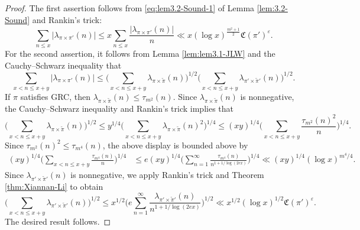 \documentclass[12pt,reqno]{amsart}
\theoremstyle{remark}
\numberwithin{equation}{section}
\begin{document}
    \begin{proof}
        The first assertion follows from \eqref{eq:lem3.2-Sound-1} of Lemma \ref{lem:3.2-Sound} and Rankin's trick:
	\[
            \sum_{n\le x} |\lambda_{\pi\times\pi'}(n)| \leq x\sum_{n\le x} \frac{|\lambda_{\pi\times\pi'}(n)|}{n} \ll x(\log x)^{\frac{m^2+1}{2}}\mathfrak{C}(\pi')^{\varepsilon}.
	\]
        For the second assertion, it follows from Lemma \ref{lem:lem3.1-JLW} and the Cauchy--Schwarz inequality that 
	\begin{equation*}
            \sum_{x < n \le x+y} |\lambda_{\pi \times \pi'}(n)| \le \Big(\sum_{x < n \le x+y} \lambda_{\pi \times \widetilde{\pi}}(n) \Big)^{1/2}\Big(\sum_{x < n \le x+y}\lambda_{\pi' \times \widetilde{\pi}'}(n)\Big)^{1/2}. 
        \end{equation*}
        If $\pi$ satisfies GRC, then $\lambda_{\pi \times \widetilde{\pi}}(n) \le \tau_{m^2}(n)$. Since $\lambda_{\pi \times \widetilde{\pi}}(n)$ is nonnegative, the Cauchy--Schwarz inequality and Rankin's trick implies that
	\begin{equation*}
            \Big(\sum_{x < n \le x+y} \lambda_{\pi \times \widetilde{\pi}}(n) \Big)^{1/2} \le y^{1/4}\Big(\sum_{x < n \le x+y} \lambda_{\pi \times \widetilde{\pi}}(n)^2 \Big)^{1/4} \le (xy)^{1/4}\Big(\sum_{x < n \le x+y} \frac{\tau_{m^2}(n)^2}{n} \Big)^{1/4}.
	\end{equation*}
        Since $\tau_{m^2}(n)^2 \le \tau_{m^4}(n)$, the above display is bounded above by
        \begin{equation*}
		\begin{aligned}
     (xy)^{1/4}\Big(\sum_{x < n \le x+y} \frac{\tau_{m^4}(n)}{n} \Big)^{1/4} & \leq e (xy)^{1/4}\Big(\sum_{n=1}^{\infty} \frac{\tau_{m^4}(n)}{n^{1+1/\log(2ex)}} \Big)^{1/4} \ll (xy)^{1/4}(\log x)^{{m^4}/{4}}.
		\end{aligned}
	\end{equation*}	
        Since $\lambda_{\pi' \times \widetilde{\pi}'}(n)$ is nonnegative, we apply Rankin's trick  and Theorem \ref{thm:Xiannan-Li} to obtain
	\begin{equation*}
            \Big(\sum_{x < n \le x+y} \lambda_{\pi' \times \widetilde{\pi}'}(n)\Big)^{1/2}
            \leq x^{1/2} \Big(e\sum_{ n =1}^{\infty} \frac{\lambda_{\pi' \times \widetilde{\pi}'}(n)}{n^{1+1/\log(2ex)}}\Big)^{1/2} 
            \ll x^{1/2}(\log x)^{1/2} \mathfrak{C}(\pi')^{\varepsilon}.
		\end{equation*}
  The desired result follows.\end{proof}
        
\end{document}
